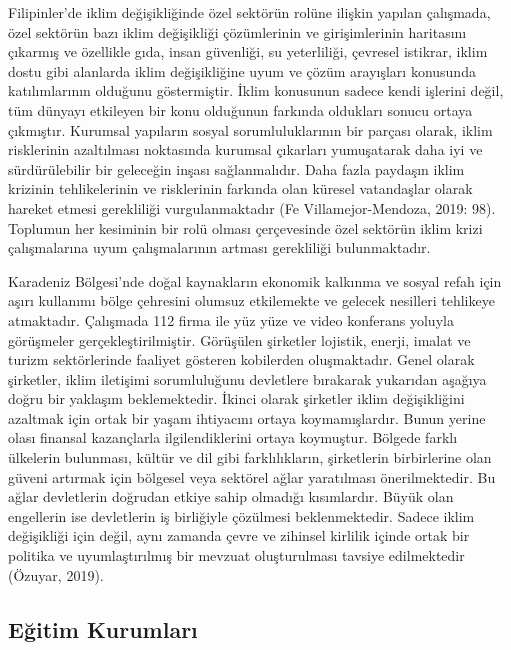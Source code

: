 \documentclass[
]{book}
\begin{document}
Filipinler'de iklim değişikliğinde özel sektörün rolüne ilişkin yapılan çalışmada, özel sektörün bazı iklim değişikliği çözümlerinin ve girişimlerinin haritasını çıkarmış ve özellikle gıda, insan güvenliği, su yeterliliği, çevresel istikrar, iklim dostu gibi alanlarda iklim değişikliğine uyum ve çözüm arayışları konusunda katılımlarının olduğunu göstermiştir. İklim konusunun sadece kendi işlerini değil, tüm dünyayı etkileyen bir konu olduğunun farkında oldukları sonucu ortaya çıkmıştır. Kurumsal yapıların sosyal sorumluluklarının bir parçası olarak, iklim risklerinin azaltılması noktasında kurumsal çıkarları yumuşatarak daha iyi ve sürdürülebilir bir geleceğin inşası sağlanmalıdır. Daha fazla paydaşın iklim krizinin tehlikelerinin ve risklerinin farkında olan küresel vatandaşlar olarak hareket etmesi gerekliliği vurgulanmaktadır (Fe Villamejor-Mendoza, 2019: 98). Toplumun her kesiminin bir rolü olması çerçevesinde özel sektörün iklim krizi çalışmalarına uyum çalışmalarının artması gerekliliği bulunmaktadır.

Karadeniz Bölgesi'nde doğal kaynakların ekonomik kalkınma ve sosyal refah için aşırı kullanımı bölge çehresini olumsuz etkilemekte ve gelecek nesilleri tehlikeye atmaktadır. Çalışmada 112 firma ile yüz yüze ve video konferans yoluyla görüşmeler gerçekleştirilmiştir. Görüşülen şirketler lojistik, enerji, imalat ve turizm sektörlerinde faaliyet gösteren kobilerden oluşmaktadır. Genel olarak şirketler, iklim iletişimi sorumluluğunu devletlere bırakarak yukarıdan aşağıya doğru bir yaklaşım beklemektedir. İkinci olarak şirketler iklim değişikliğini azaltmak için ortak bir yaşam ihtiyacını ortaya koymamışlardır. Bunun yerine olası finansal kazançlarla ilgilendiklerini ortaya koymuştur. Bölgede farklı ülkelerin bulunması, kültür ve dil gibi farklılıkların, şirketlerin birbirlerine olan güveni artırmak için bölgesel veya sektörel ağlar yaratılması önerilmektedir. Bu ağlar devletlerin doğrudan etkiye sahip olmadığı kısımlardır. Büyük olan engellerin ise devletlerin iş birliğiyle çözülmesi beklenmektedir. Sadece iklim değişikliği için değil, aynı zamanda çevre ve zihinsel kirlilik içinde ortak bir politika ve uyumlaştırılmış bir mevzuat oluşturulması tavsiye edilmektedir (Özuyar, 2019).

\hypertarget{eux11fitim-kurumlarux131}{%
\subsection{Eğitim Kurumları}\label{eux11fitim-kurumlarux131}}
\end{document}
